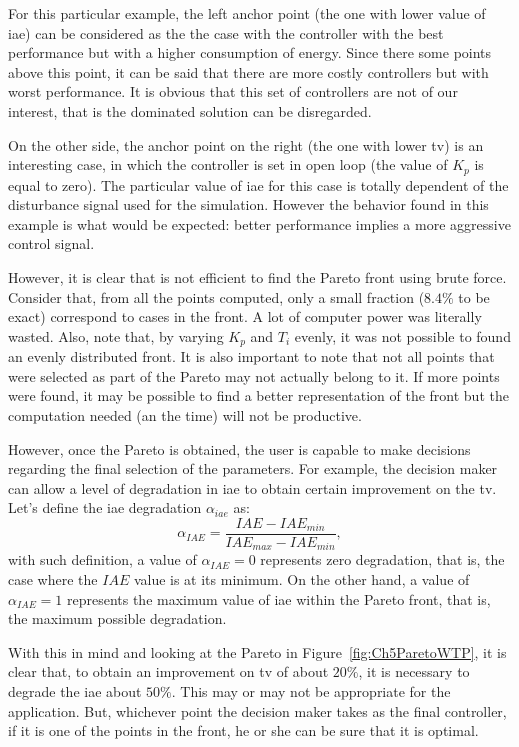 For this particular example, the left anchor point (the one with lower value of \gls{iae}) can be considered as the the case with the controller with the best performance but with a higher consumption of energy. Since there some points above this point, it can be said that there are more costly controllers but with worst performance. It is obvious that this set of controllers are not of our interest, that is the dominated solution can be disregarded.

On the other side, the anchor point on the right (the one with lower \gls{tv}) is an interesting case, in which the controller is set in open loop (the value of $K_p$ is equal to zero). The particular value of \gls{iae} for this case is totally dependent of the disturbance signal used for the simulation. However the behavior found in this example is what would be expected: better performance implies a more aggressive control signal.

However, it is clear that is not efficient to find the Pareto front using brute force. Consider that, from all the points computed, only a small fraction ($8.4\%$ to be exact) correspond to cases in the front. A lot of computer power was literally wasted. Also, note that, by varying $K_p$ and $T_i$ evenly, it was not possible to found an evenly distributed front. It is also important to note that not all points that were selected as part of the Pareto may not actually belong to it. If more points were found, it may be possible to find a better representation of the front but the computation needed (an the time) will not be productive.

However, once the Pareto is obtained, the user is capable to make decisions regarding the final selection of the parameters. For example, the decision maker can allow a level of degradation in \gls{iae} to obtain certain improvement on the \gls{tv}. Let's define the \gls{iae} degradation $\alpha_{iae}$ as:
\begin{equation*}
	\alpha_{IAE} = \frac{IAE - IAE_{min}}{IAE_{max}-IAE_{min}},
\end{equation*}
%
with such definition, a value of $\alpha_{IAE} = 0$ represents zero degradation, that is, the case where the $IAE$ value is at its minimum. On the other hand, a value of $\alpha_{IAE} = 1$ represents the maximum value of \gls{iae} within the Pareto front, that is, the maximum possible degradation.

With this in mind and looking at the Pareto in Figure~\ref{fig:Ch5ParetoWTP}, it is clear that, to obtain an improvement on \gls{tv} of about $20\%$, it is necessary to degrade the \gls{iae} about $50\%$. This may or may not be appropriate for the application. But, whichever point the decision maker takes as the final controller, if it is one of the points in the front, he or she can be sure that it is optimal.

